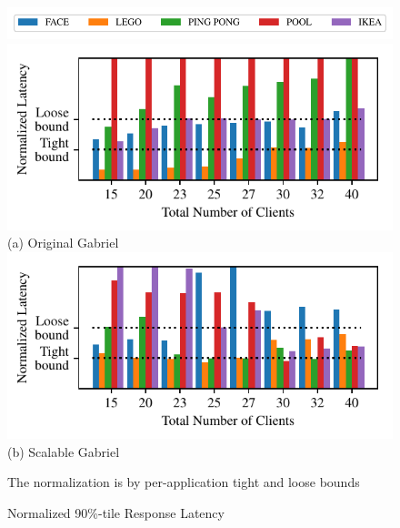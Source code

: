 \begin{figure}[t]
  \begin{center}
    \includegraphics[width=\linewidth]{FIGS/fig-alloc-latency-legend.pdf}
    \includegraphics[width=\linewidth]{FIGS/fig-alloc-latency-baseline.pdf}
    {\small (a) Original Gabriel}
    \includegraphics[width=\linewidth]{FIGS/fig-alloc-latency-cpushares.pdf}
    {\small (b) Scalable Gabriel}
  \end{center}
\begin{captiontext}
The normalization is  by per-application tight and loose bounds~\cite{Chen2017}
\end{captiontext}
\vspace{-0.1in}
  \caption{\small Normalized 90\%-tile Response Latency}
  \label{fig:alloc-latency}
\end{figure}


